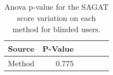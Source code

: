 
\begin{table}[!htb]
\centering
\caption{Anova p-value for the SAGAT score variation on each method for blinded users.}
\label{tab:blocanova_sagat_var_sight}
\begin{tabular}{lrrrrr}
\toprule
Source & P-Value \\
\midrule
Method &   0.775 \\
\bottomrule
\end{tabular}
\end{table}


